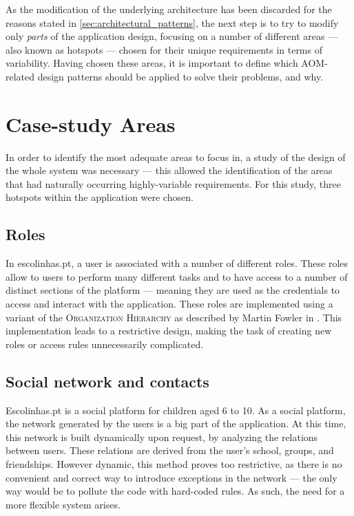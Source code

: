As the modification of the underlying architecture has been discarded for the reasons stated in \ref{sec:architectural_patterns}, the next step is to try to modify only \emph{parts} of the application design, focusing on a number of different areas --- also known as hotspots --- chosen for their unique requirements in terms of variability. Having chosen these areas, it is important to define which AOM-related design patterns should be applied to solve their problems, and why.

\section{Case-study Areas}\label{sec:case-study_areas}

In order to identify the most adequate areas to focus in, a study of the design of the whole system was necessary --- this allowed the identification of the areas that had naturally occurring highly-variable requirements. For this study, three hotspots within the application were chosen.

\subsection{Roles}\label{sec:case-study_areas_roles}

In escolinhas.pt, a user is associated with a number of different roles. These roles allow to users to perform many different tasks and to have access to a number of distinct sections of the platform --- meaning they are used as the credentials to access and interact with the application. These roles are implemented using a variant of the \textsc{Organization Hierarchy} as described by Martin Fowler in \cite{fowler_accountability}. This implementation leads to a restrictive design, making the task of creating new roles or access rules unnecessarily complicated.
  
\subsection{Social network and contacts}\label{sec:case-study_areas_social_network}
Escolinhas.pt is a social platform for children aged 6 to 10. As a social platform, the network generated by the users is a big part of the application. At this time, this network is built dynamically upon request, by analyzing the relations between users. These relations are derived from the user's school, groups, and friendships. However dynamic, this method proves too restrictive, as there is no convenient and correct way to introduce exceptions in the network --- the only way would be to pollute the code with hard-coded rules. As such, the need for a more flexible system arises.

